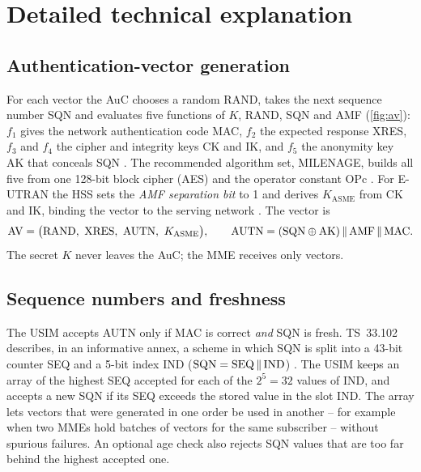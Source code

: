 \documentclass[11pt,a4paper]{article}
\begin{document}
\section{Detailed technical explanation}

\subsection{Authentication-vector generation}
For each vector the AuC chooses a random RAND, takes the next sequence number SQN and evaluates five
functions of $K$, RAND, SQN and AMF (\cref{fig:av}): $f_1$ gives the network authentication code MAC,
$f_2$ the expected response XRES, $f_3$ and $f_4$ the cipher and integrity keys CK and IK, and $f_5$ the
anonymity key AK that conceals SQN \cite{ts33102}. The recommended algorithm set, MILENAGE, builds
all five from one 128-bit block cipher (AES) and the operator constant OPc \cite{ts35206}. For E-UTRAN the
HSS sets the \emph{AMF separation bit} to 1 and derives $K_{\mathrm{ASME}}$ from CK and IK, binding the
vector to the serving network \cite{ts33401}. The vector is
\begin{equation}\label{eq:autn}
  \mathrm{AV} = \bigl(\mathrm{RAND},\ \mathrm{XRES},\ \mathrm{AUTN},\ K_{\mathrm{ASME}}\bigr),\qquad
  \mathrm{AUTN} = (\mathrm{SQN}\xor\mathrm{AK})\concat\mathrm{AMF}\concat\mathrm{MAC}.
\end{equation}
The secret $K$ never leaves the AuC; the MME receives only vectors.

\begin{acnfigure}
  \caption{Authentication-vector generation in the AuC with the functions $f_1$--$f_5$.}
  \label{fig:av}
\end{acnfigure}

\subsection{Sequence numbers and freshness}
The USIM accepts AUTN only if MAC is correct \emph{and} SQN is fresh. TS~33.102 describes, in an
informative annex, a scheme in which SQN is split into a 43-bit counter SEQ and a 5-bit index IND
($\mathrm{SQN} = \mathrm{SEQ}\,\Vert\,\mathrm{IND}$) \cite{ts33102}. The USIM keeps an array of the highest SEQ
accepted for each of the $2^5 = 32$ values of IND, and accepts a new SQN if its SEQ exceeds the stored
value in the slot IND. The array lets vectors that were generated in one order be used in another --
for example when two MMEs hold batches of vectors for the same subscriber -- without spurious
failures. An optional age check also rejects SQN values that are too far behind the highest accepted
one.
\end{document}
